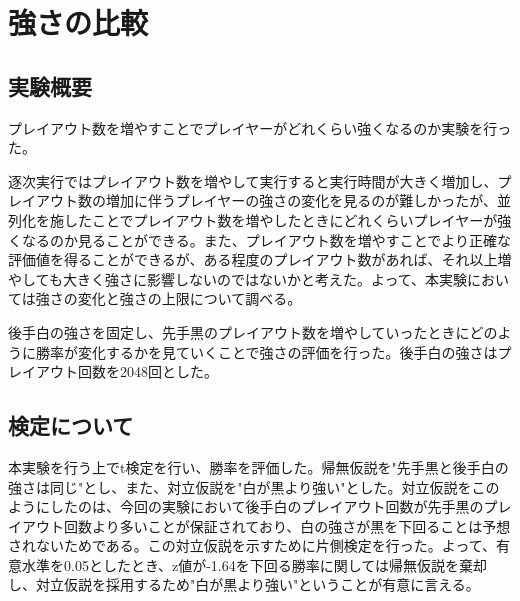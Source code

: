 \documentclass[10pt, a4paper]{jsarticle}
\begin{document}
\section{強さの比較}
\subsection{実験概要}
プレイアウト数を増やすことでプレイヤーがどれくらい強くなるのか実験を行った。
\par 逐次実行ではプレイアウト数を増やして実行すると実行時間が大きく増加し、プレイアウト数の増加に伴うプレイヤーの強さの変化を見るのが難しかったが、並列化を施したことでプレイアウト数を増やしたときにどれくらいプレイヤーが強くなるのか見ることができる。また、プレイアウト数を増やすことでより正確な評価値を得ることができるが、ある程度のプレイアウト数があれば、それ以上増やしても大きく強さに影響しないのではないかと考えた。よって、本実験においては強さの変化と強さの上限について調べる。
\par 後手白の強さを固定し、先手黒のプレイアウト数を増やしていったときにどのように勝率が変化するかを見ていくことで強さの評価を行った。後手白の強さはプレイアウト回数を2048回とした。
\subsection{検定について}
本実験を行う上でt検定を行い、勝率を評価した。帰無仮説を"先手黒と後手白の強さは同じ"とし、また、対立仮説を"白が黒より強い"とした。対立仮説をこのようにしたのは、今回の実験において後手白のプレイアウト回数が先手黒のプレイアウト回数より多いことが保証されており、白の強さが黒を下回ることは予想されないためである。この対立仮説を示すために片側検定を行った。よって、有意水準を0.05としたとき、z値が-1.64を下回る勝率に関しては帰無仮説を棄却し、対立仮説を採用するため"白が黒より強い"ということが有意に言える。
\end{document}

